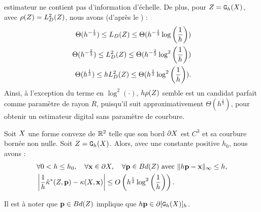 estimateur ne contient pas d'information d'échelle. De plus, pour $Z =
\mathtt{G}_{h}(X)$, avec $\rho(Z) = L^2_D(Z)$, nous avons (d'après le
) :
%
\begin{align}
  \Theta(h^{-\frac{1}{3}}) \le L_D( Z ) \le \Theta(h^{-\frac{1}{3}} \log \left(\frac{1}{h}\right)) \\
  \Theta(h^{-\frac{2}{3}}) \le L^2_D( Z ) \le \Theta(h^{-\frac{2}{3}} \log^2 \left(\frac{1}{h}\right)) \\
  \Theta(h^{\frac{1}{3}}) \le hL^2_D( Z ) \le \Theta(h^{\frac{1}{3}} \log^2 \left(\frac{1}{h}\right)) \label{eq:bounds-length-MDSS}.
\end{align}
%
Ainsi, à l'exception du terme en $\log^2(\cdot)$, $h \rho(Z)$ semble est
un candidat parfait comme paramètre de rayon $R$, puisqu'il suit
approximativement $\Theta(h^\frac{1}{3})$, pour obtenir un estimateur digital
sans paramètre de courbure.
%
\begin{theorem}
\label{thm:curvature-estimator-2d-pf-conv}
  Soit $X$ une forme convexe de $\mathbb{R}^2$ telle que son bord $\partial X$ est
  $C^3$ et sa courbure bornée non nulle. Soit $Z = \mathtt{G}_{h}(X)$. Alors, avec une
  constante positive $h_0$, nous avons :
  \begin{align}
    &\forall 0 < h \le h_0, \quad \forall \mathbf{x} \in \partial X, \quad \forall \mathbf{p} \in Bd({Z}) \text{~avec~} \| h\mathbf{p} -\mathbf{x}\|_\infty \le h, \nonumber\\
    &\left | \frac{1}{h}\hat{\kappa}^{*}(Z,\mathbf{p}) - \kappa(X,\mathbf{x}) \right| \le O\left( h^{\frac{1}{3}} \log^2 \left(\frac{1}{h}\right)\right) .
  \end{align}
\end{theorem}
%
Il est à noter que $\mathbf{p} \in Bd({Z})$ implique que $h\mathbf{p} \in
\partial \lbrack \mathtt{G}_{h}(X) \rbrack_{h}$.
%
\\
%
